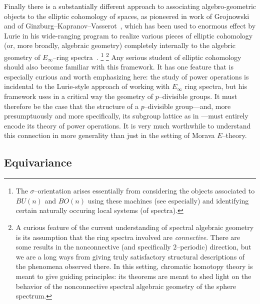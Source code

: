 Finally there is a substantially different approach to associating algebro-geometric objects to the elliptic cohomology of spaces, as pioneered in work of Grojnowski~\cite{Grojnowski} and of Ginzburg--Kapranov--Vasserot~\cite{GKV}, which has been used to enormous effect by Lurie in his wide-ranging program to realize various pieces of elliptic cohomology (or, more broadly, algebraic geometry) completely internally to the algebric geometry of \(E_\infty\)--ring spectra~\cite{LurieSurveyOfEll}.%
\footnote{%
The \(\sigma\)--orientation arises essentially from considering the objects associated to \(BU(n)\) and \(BO(n)\) using these machines (see \cite[Section 5.1]{LurieSurveyOfEll} especially) and identifying certain naturally occuring local systems (of spectra).
}%
\footnote{%
A curious feature of the current understanding of spectral algebraic geometry is its assumption that the ring spectra involved are \emph{connective}.
There are some results in the nonconnective (and specifically $2$--periodic) direction, but we are a long ways from giving truly satisfactory structural descriptions of the phenomena observed there.
In this setting, chromatic homotopy theory is meant to give guiding principles: its theorems are meant to shed light on the behavior of the nonconnective spectral algebraic geometry of the sphere spectrum.
}
Any serious student of elliptic cohomology should also become familiar with this framework.
It has one feature that is especially curious and worth emphasizing here: the study of power operations is incidental to the Lurie-style approach of working with \(E_\infty\) ring spectra, but his framework uses in a critical way the geometry of \(p\)--divisible groups.
It must therefore be the case that the structure of a \(p\)--divisible group---and, more presumptuously and more specifically, its subgroup lattice as in ---must entirely encode its theory of power operations.
It is very much worthwhile to understand this connection in more generality than just in the setting of Morava \(E\)--theory.







\subsection*{Equivariance}

